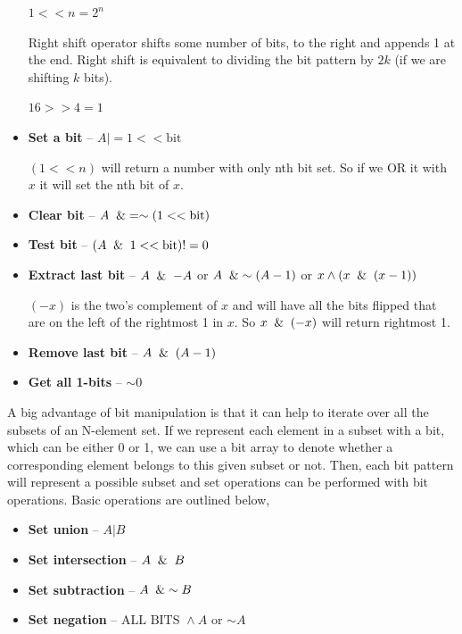 \documentclass{article}
\begin{document}
\begin{itemize}
        $1 << n = 2^n$
        
        Right shift operator shifts some number of bits, to the right and appends 1 at the end. Right shift is equivalent to dividing the bit pattern by $2k$ (if we are shifting $k$ bits).
        
        $16 >> 4 = 1$
        
        \item \textbf{Set a bit}  -- $A \vert= 1 <<  \text{bit}$
        
        $(1 << n)$ will return a number with only nth bit set. So if we OR it with $x$ it will set the nth bit of $x$.
        
        \item \textbf{Clear bit} -- $A \And = \sim (1 << \text{bit})$
        \item \textbf{Test bit} -- $(A \And 1 << \text{bit}) != 0$
        \item \textbf{Extract last bit} -- $A\And-A$ or $A \And \sim (A-1)$ or $x\wedge (x \And (x -1))$
        
        $(-x)$ is the two’s complement of $x$ and will have all the bits flipped that are on the left of the rightmost 1 in $x$. So $x \And (-x)$ will return rightmost 1.
        
        \item \textbf{Remove last bit} -- $A \And (A-1)$
        \item \textbf{Get all 1-bits} -- $\sim 0$
        
    \end{itemize}
    
    A big advantage of bit manipulation is that it can help to iterate over all the subsets of an N-element set. If we represent each element in a subset with a bit, which can be either 0 or 1, we can use a bit array to denote whether a corresponding element belongs to this given subset or not. Then, each bit pattern will represent a possible subset and set operations can be performed with bit operations. Basic operations are outlined below,
    
    \begin{itemize}
        \item \textbf{Set union} -- $A \vert B$
        \item \textbf{Set intersection} -- $A \And B$
        \item \textbf{Set subtraction} -- $A \And \sim B$
        \item \textbf{Set negation} -- $\text{ALL BITS } \wedge A$ or $\sim A$
    \end{itemize}
    
\end{document}
